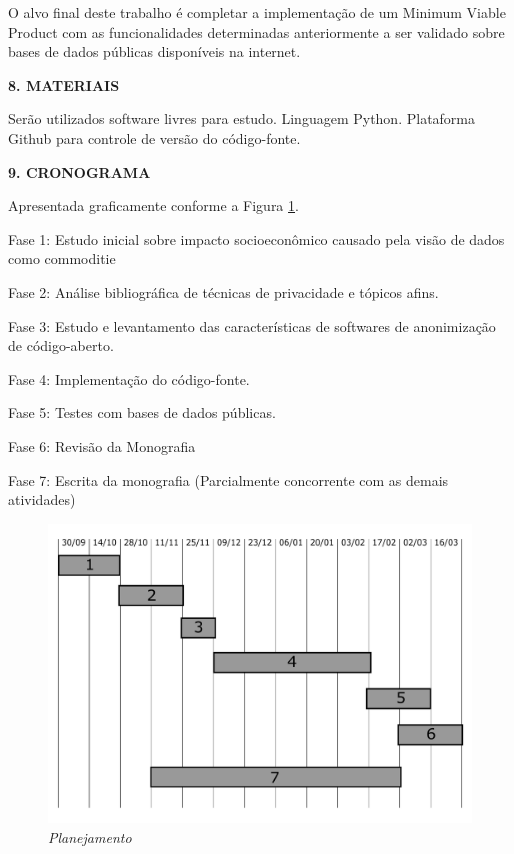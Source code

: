 \documentclass[a4paper,12pt,oneside,openany]{report}
\begin{document}
O alvo final deste trabalho é completar a implementação de um Minimum Viable Product com as funcionalidades determinadas anteriormente a ser validado sobre bases de dados públicas disponíveis na internet.

\vspace{0.4cm}
\textbf{8. MATERIAIS}
	
Serão utilizados software livres para estudo. Linguagem Python. Plataforma Github para controle de versão do código-fonte.

\vspace{0.4cm}
\textbf{9. CRONOGRAMA}

Apresentada graficamente conforme a Figura \ref{Fig:Cronograma}.

Fase 1: Estudo inicial sobre impacto socioeconômico causado pela visão de dados como commoditie

Fase 2: Análise bibliográfica de técnicas de privacidade e tópicos afins.

Fase 3: Estudo e levantamento das características de softwares de anonimização de código-aberto.

Fase 4: Implementação do código-fonte.

Fase 5: Testes com bases de dados públicas.

Fase 6: Revisão da Monografia

Fase 7: Escrita da monografia (Parcialmente concorrente com as demais atividades)


\begin{figure}
\begin{center}
\parbox[h]{14cm}
  {
  \begin{center}
  \includegraphics[scale=0.45]{Figuras/gantt.pdf}
  \caption[\small{\textit{Planejamento}}]{\label{Fig:Cronograma} \footnotesize{\textit{Planejamento}}}
  \end{center}
  }
\end{center}
\end{figure} 
\end{document}
